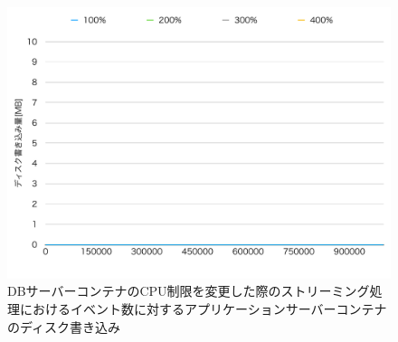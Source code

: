 \documentclass[../../../../../main]{subfiles}
\begin{document}
    \begin{figure}[H]
        \centering
        \includegraphics[width=12cm]{graph}
        \caption{DBサーバーコンテナのCPU制限を変更した際のストリーミング処理におけるイベント数に対するアプリケーションサーバーコンテナのディスク書き込み}
        \label{fig:stream-change-db-cpu-limit-app-disk-in-app_4_8192-db_1024}
    \end{figure}
\end{document}
